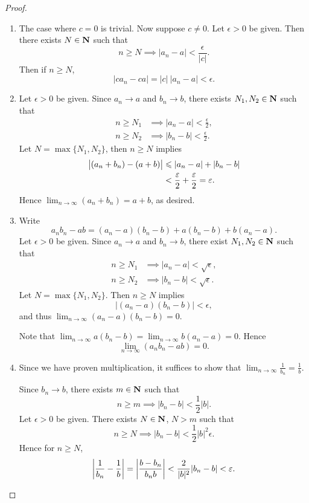 \begin{proof} \
\begin{enumerate}[label=(\roman*)]
\item The case where $c=0$ is trivial. Now suppose $c\neq0$. Let $\epsilon>0$ be given. Then there exists $N\in\mathbf N$ such that
\[n\ge N\implies|a_n-a|<\frac{\epsilon}{|c|}.\]
Then if $n\ge N$,
\[|ca_n-ca|=|c|\:|a_n-a|<\epsilon.\]

\item Let $\epsilon>0$ be given. Since $a_n\to a$ and $b_n\to b$, there exists $N_1,N_2\in\mathbf N$ such that
\begin{align*}
n\ge N_1&\implies|a_n-a|<\frac{\epsilon}{2},\\
n\ge N_2&\implies|b_n-b|<\frac{\epsilon}{2}.
\end{align*}
Let $N=\max\{N_1,N_2\}$, then $n\ge N$ implies
\begin{align*}
\left|(a_n+b_n)-(a+b)\right|
&\leqslant|a_n-a|+|b_n-b|\\
&<\frac{\varepsilon}{2}+\frac{\varepsilon}{2}=\varepsilon.
\end{align*}
Hence $\displaystyle\lim_{n\to\infty}(a_n+b_n)=a+b$, as desired.

\item Write
\[a_nb_n-ab=(a_n-a)(b_n-b)+a(b_n-b)+b(a_n-a).\]
Let $\epsilon>0$ be given. Since $a_n\to a$ and $b_n\to b$, there exist $N_1,N_2\in\mathbf N$ such that
\begin{align*}
n\ge N_1&\implies|a_n-a|<\sqrt{\epsilon},\\
n\ge N_2&\implies|b_n-b|<\sqrt{\epsilon}.
\end{align*}
Let $N=\max\{N_1,N_2\}$. Then $n\ge N$ implies
\[|(a_n-a)(b_n-b)|<\epsilon,\]
and thus $\displaystyle\lim_{n\to\infty}(a_n-a)(b_n-b)=0$.

Note that $\displaystyle\lim_{n\to\infty}a(b_n-b)=\lim_{n\to\infty}b(a_n-a)=0$. Hence
\[\lim_{n\to\infty}(a_nb_n-ab)=0.\]

\item Since we have proven multiplication, it suffices to show that $\displaystyle\lim_{n\to\infty}\frac{1}{b_n}=\frac{1}{b}$.

Since $b_n\to b$, there exists $m\in\mathbf N$ such that
\[n\ge m\implies|b_n-b|<\frac{1}{2}|b|.\]
Let $\epsilon>0$ be given. There exists $N\in\mathbf N$, $N>m$ such that
\[n\ge N\implies|b_n-b|<\frac{1}{2}|b|^2\epsilon.\]
Hence for $n\ge N$,
\[\left|\frac{1}{b_n}-\frac{1}{b}\right|=\left|\frac{b-b_n}{b_nb}\right|<\frac{2}{|b|^2}|b_n-b|<\varepsilon.\]
\end{enumerate}
\end{proof}


